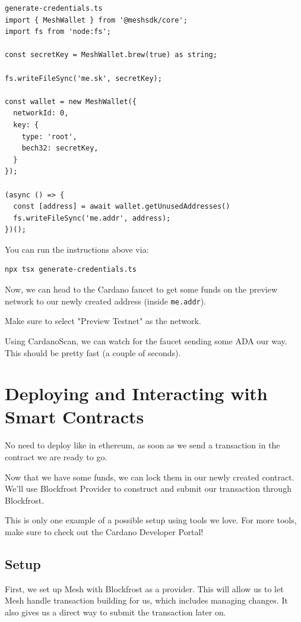 \begin{verbatim}
generate-credentials.ts
import { MeshWallet } from '@meshsdk/core';
import fs from 'node:fs';

const secretKey = MeshWallet.brew(true) as string;

fs.writeFileSync('me.sk', secretKey);

const wallet = new MeshWallet({
  networkId: 0,
  key: {
    type: 'root',
    bech32: secretKey,
  }
});

(async () => {
  const [address] = await wallet.getUnusedAddresses()
  fs.writeFileSync('me.addr', address);
})();
\end{verbatim}

You can run the instructions above via:

\begin{verbatim}
npx tsx generate-credentials.ts
\end{verbatim}

Now, we can head to the Cardano faucet to get some funds on the preview network to our newly created address (inside \texttt{me.addr}).

Make sure to select "Preview Testnet" as the network.

Using CardanoScan, we can watch for the faucet sending some ADA our way. This should be pretty fast (a couple of seconds).

\section{Deploying and Interacting with Smart Contracts}
No need to deploy like in ethereum, as soon as we send a transaction in the contract we are ready to go.

Now that we have some funds, we can lock them in our newly created contract. We'll use Blockfrost Provider to construct and submit our transaction through Blockfrost.

This is only one example of a possible setup using tools we love. For more tools, make sure to check out the Cardano Developer Portal!

\subsection{Setup}
First, we set up Mesh with Blockfrost as a provider. This will allow us to let Mesh handle transaction building for us, which includes managing changes. It also gives us a direct way to submit the transaction later on.

